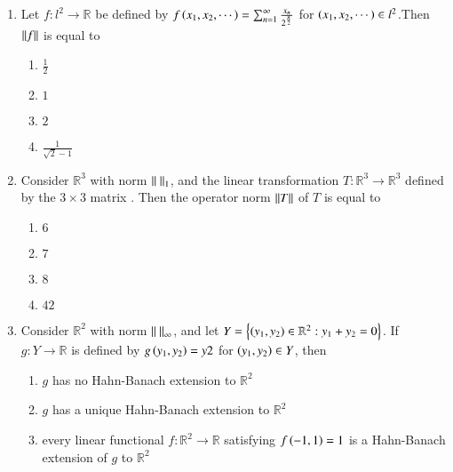 \documentclass[journal]{IEEEtran}
\begin{document}
\begin{enumerate}
{\begin{multicols}{4}
\begin{enumerate}
\item $1$
\item $2$
\item $3$
\item $4$
\end{enumerate}
\end{multicols}
}
\item{
Let $f:l^2\rightarrow\mathbb{R}$ be defined by $f\left(x_1,x_2,\cdots\right)=\sum_{n=1}^\infty\frac{x_n}{2^{\frac{n}{2}}}$ for $\left(x_1,x_2,\cdots\right)\in l^2$.Then $\left\lVert f\right\rVert$ is equal to
\begin{multicols}{4}
\begin{enumerate}
\item $\frac{1}{2}$
\item $1$
\item $2$
\item $\frac{1}{\sqrt{2}-1}$
\end{enumerate}
\end{multicols}
}
\item{
Consider $\mathbb{R}^3$ with norm $\left\lVert\text{ }\right\rVert_1$, and the linear transformation $T:\mathbb{R}^3\rightarrow\mathbb{R}^3$ defined by the $3\times3$ matrix . Then the operator norm $\left\lVert T\right\rVert$ of $T$ is equal to
\begin{multicols}{4}
\begin{enumerate}
\item $6$
\item $7$
\item $8$
\item $42$
\end{enumerate}
\end{multicols}
}
\item{
Consider $\mathbb{R}^2$ with norm $\left\lVert\text{ }\right\rVert_\infty$, and let $Y=\left\{\left(y_1,y_2\right)\in \mathbb{R}^2:y_1+y_2=0\right\}$. If $g:Y\rightarrow\mathbb{R}$ is defined by $g\left(y_1,y_2\right)=y2$ for $\left(y_1,y_2\right)\in Y$, then
\begin{enumerate}
\item $g$ has no Hahn-Banach extension to $\mathbb{R}^2$
\item $g$ has a unique Hahn-Banach extension to $\mathbb{R}^2$
\item every linear functional $f:\mathbb{R}^2\rightarrow\mathbb{R}$ satisfying $f\left(-1,1\right)=1$ is a Hahn-Banach extension of $g$ to $\mathbb{R}^2$ 

\end{enumerate}}
\end{enumerate}
\end{document}
